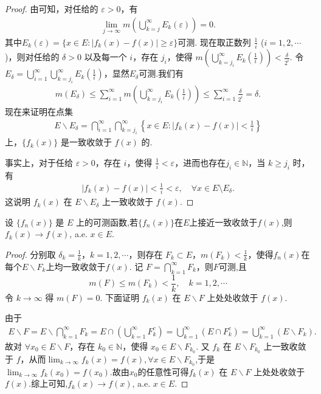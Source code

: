 \documentclass[../../main.tex]{subfiles}%
\begin{document}
\begin{proof}
由可知，对任给的 $\varepsilon>0$，有
\begin{align*}
\lim_{j\to\infty}m\left(\bigcup_{k = j}^{\infty}E_k(\varepsilon)\right)=0.
\end{align*}
其中$E_k(\varepsilon) = \{x \in E: |f_k(x) - f(x)| \geqslant \varepsilon\}$可测.
现在取正数列 $\frac{1}{i}$ ($i = 1,2,\cdots$)，则对任给的 $\delta>0$ 以及每一个 $i$，存在 $j_i$，使得 $m\left(\bigcup_{k = j_i}^{\infty}E_k\left(\frac{1}{i}\right)\right)<\frac{\delta}{2^i}$. 令 $E_\delta=\bigcup_{i = 1}^{\infty}\bigcup_{k = j_i}^{\infty}E_k\left(\frac{1}{i}\right)$，显然$E_\delta$可测.我们有
\begin{align*}
m(E_\delta)\leqslant\sum_{i = 1}^{\infty}m\left(\bigcup_{k = j_i}^{\infty}E_k\left(\frac{1}{i}\right)\right)\leqslant\sum_{i = 1}^{\infty}\frac{\delta}{2^i}=\delta.
\end{align*}
现在来证明在点集
\begin{align*}
E\backslash E_\delta=\bigcap_{i = 1}^{\infty}\bigcap_{k = j_i}^{\infty}\left\{x\in E:\vert f_k(x)-f(x)\vert<\frac{1}{i}\right\}
\end{align*}
上，$\{f_k(x)\}$ 是一致收敛于 $f(x)$ 的.

事实上，对于任给 $\varepsilon>0$，存在 $i$，使得 $\frac{1}{i}<\varepsilon$，进而也存在$j_i\in \mathbb{N}$，当 $k\geqslant j_i$ 时，有
\begin{align*}
\vert f_k(x)-f(x)\vert<\frac{1}{i}<\varepsilon,\quad \forall x\in E\setminus E_\delta.
\end{align*}
这说明 $f_k(x)$ 在 $E\backslash E_\delta$ 上一致收敛于 $f(x)$. 
\end{proof}

\begin{theorem}\label{theorem:Egorov定理的逆定理}
设 $\{f_n(x)\}$ 是 $E$ 上的可测函数,若$\{f_n(x)\}$在$E$上接近一致收敛于$f(x)$,则$f_k(x)\to f(x)$, a.e. $x\in E$.
\end{theorem}
\begin{proof}
分别取 $\delta_k = \frac{1}{k}$，$k = 1,2,\cdots$，则存在 $F_k\subset E$，$m(F_k)<\frac{1}{k}$，使得$f_n(x)$在每个$E\backslash F_k$上均一致收敛于$f(x)$.
记 $F = \bigcap_{k = 1}^{\infty}F_k$，则$F$可测,且
\[
m(F)\leqslant m(F_k)<\frac{1}{k},\quad k = 1,2,\cdots
\]
令 $k\to\infty$ 得 $m(F) = 0$. 下面证明 $f_k(x)$ 在 $E\backslash F$ 上处处收敛于 $f(x)$.

由于
\begin{align*}
E\backslash F=E\backslash \bigcap_{k = 1}^{\infty}F_k=E\cap\left(\bigcup_{k = 1}^{\infty}F_k^c\right)
=\bigcup_{k = 1}^{\infty}(E\cap F_k^c)=\bigcup_{k = 1}^{\infty}(E\backslash F_k).
\end{align*}
故对 $\forall x_0\in E\backslash F$，存在 $k_0\in\mathbb{N}$，使得 $x_0\in E\backslash F_{k_0}$. 又 $f_k$ 在 $E\backslash F_{k_0}$ 上一致收敛于 $f$，从而$\lim_{k\to \infty}f_k(x)=f(x),\forall x\in E\backslash F_{k_0}$,于是$\lim_{k\to \infty}f_k(x_0)=f(x_0)$.故由$x_0$的任意性可得$f_k(x)$ 在 $E\backslash F$ 上处处收敛于 $f(x)$.综上可知,$f_k(x)\to f(x)$, a.e. $x\in E$.
\end{proof}
\end{document}
